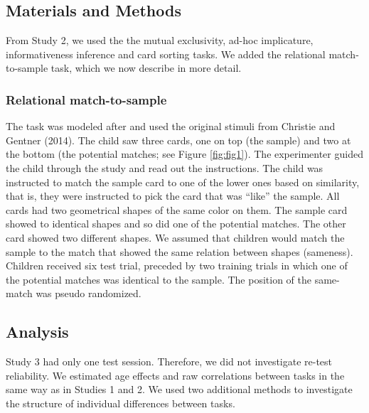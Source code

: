 \documentclass[
  english,
  man,floatsintext]{apa6}
\begin{document}
\hypertarget{materials-and-methods}{%
\subsection{Materials and Methods}\label{materials-and-methods}}

From Study 2, we used the the mutual exclusivity, ad-hoc implicature, informativeness inference and card sorting tasks. We added the relational match-to-sample task, which we now describe in more detail.

\hypertarget{relational-match-to-sample}{%
\subsubsection{Relational match-to-sample}\label{relational-match-to-sample}}

The task was modeled after and used the original stimuli from Christie and Gentner (2014). The child saw three cards, one on top (the sample) and two at the bottom (the potential matches; see Figure \ref{fig:fig1}). The experimenter guided the child through the study and read out the instructions. The child was instructed to match the sample card to one of the lower ones based on similarity, that is, they were instructed to pick the card that was ``like'' the sample. All cards had two geometrical shapes of the same color on them. The sample card showed to identical shapes and so did one of the potential matches. The other card showed two different shapes. We assumed that children would match the sample to the match that showed the same relation between shapes (sameness). Children received six test trial, preceded by two training trials in which one of the potential matches was identical to the sample. The position of the same-match was pseudo randomized.

\hypertarget{analysis-2}{%
\subsection{Analysis}\label{analysis-2}}

Study 3 had only one test session. Therefore, we did not investigate re-test reliability. We estimated age effects and raw correlations between tasks in the same way as in Studies 1 and 2. We used two additional methods to investigate the structure of individual differences between tasks.
\end{document}
